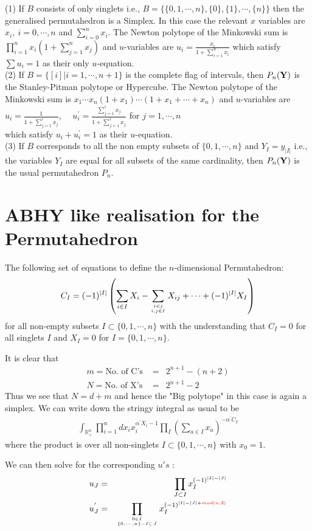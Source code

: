 \documentclass[hidelinks,12pt]{article}
\newcommand{\bea}[1]{\begin{eqnarray}\label{#1} }
\newcommand{\eea}{\end{eqnarray}}
\def\bea{\begin{eqnarray}}
\def\eea{\end{eqnarray}}
\begin{document}
(1) If $B$ consists of only singlets i.e., $B=\{ \{ 0,1,\cdots,n \}, \{ 0 \},\{ 1 \},\cdots ,\{ n \} \}$ then the generalised permutahedron is a Simplex. In this case the relevant $x$ variables are $x_i,~ i=0,\cdots,n$ and $\sum_{i=0}^n x_i$. 
The Newton polytope of the Minkowski sum is $\prod_{i=1}^{n} x_i (1+\sum_{j=1}^{n} x_j)$ and $u$-variables are 
$u_i =\frac{ x_i}{1+\sum_{i=1}^n x_i} $
which satisfy $\sum u_i =1$ as their only $u$-equation. \\

(2) If $B= \{[i] | i=1,\cdots,n+1 \}$ is the complete flag of intervals, then $P_n({\bf Y})$ is the Stanley-Pitman polytope or Hypercube.
The Newton polytope of the Minkowski sum is $x_1\cdots x_n (1+x_1) \cdots (1+x_1+\cdots +x_n)$ and $u$-variables are 
$u_i =\frac{ 1}{1+\sum_{j=1}^{i} x_j} $, ~~$u^{'}_i =\frac{ \sum_{j=1}^{i} x_j}{1+\sum_{j=1}^{i} x_j} $ for $j=1,\cdots,n$ \\
which satisfy $u_i +u^{'}_{i} =1$ as their $u$-equation. \\

(3) If $B$ corresponds to all the non empty subsets of $\{0,1,\cdots,n \}$ and $Y_I =y_{|I|}$ i.e., the variables $Y_I$ are equal for all subsets of the same cardinality, then $P_n({\bf Y})$ is the usual permutahedron $P_n$. 

\section*{ABHY like realisation for the Permutahedron}
The following set of equations to define the $n$-dimensional Permutahedron: 
\bea
C_I = (-1)^{|I|} \left( \sum_{i \in I} X_i - \sum _{{i<j}\atop{i,j \in I}} X_{ij} +\cdots + (-1)^{|I|}  X_I \right) \nonumber
\eea
for all non-empty subsets $I \subset \{0,1,\cdots,n\}$ with the understanding that $C_{I} =0$ for all singlets $I$ and $X_{I} =0$ for $I=\{ 0,1,\cdots,n \}$. 

It is clear that
\bea
m= \text{No. of  C's }&=& 2^{n+1}-(n+2) \nonumber \\
N= \text{No. of X's} &=& 2^{n+1}- 2 \nonumber 
\eea
Thus we see that $N= d+m$ and hence the "Big polytope" in this case is again a simplex. We can write down the stringy integral as usual to be 
\bea
\int_{\mathbb{R}^{n}_{+}} \prod_{i =1}^{n} d x_i x_i^{\alpha^{'} X_i -1} \prod_{I} \left (\sum_{a\in I} x_a \right) ^{-\alpha^{'} C_I} \nonumber
\eea 
where the product is over all non-singlets $ I \subset \{0,1,\cdots,n\}$ with $x_{0} =1$.

We can then solve for the corresponding $u's$ :
\bea
u_J &=& ~~\prod_{J \subset I} x_I^{(-1)^{|I|-|J|}} \nonumber \\
u^{'}_J &=& \prod_{{0 \in I}\atop{ \{0,\cdots,n\} - I \subset J}} x_I^{(-1)^{|I|-|J|+\color{red}{mod(n, 2)}}} \nonumber
\eea
\end{document}
